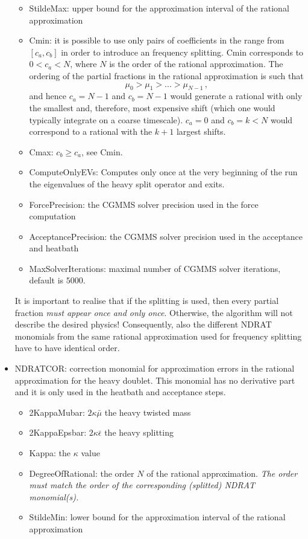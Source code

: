 \begin{itemize}
\begin{itemize}
  \item {\ttfamily StildeMax}:
    upper bound for the approximation interval of the rational approximation
  \item {\ttfamily Cmin}: it is possible to use only pairs of coefficients
    in the range from $[c_a,c_b]$ in order to introduce an frequency
    splitting. {\ttfamily Cmin} corresponds to $0<c_a< N$, where
    $N$ is the order of the rational approximation. The ordering of
    the partial fractions in the rational approximation is such that 
    \[
    \mu_0 > \mu_1 > ... > \mu_{N-1}\,,
    \]
    and hence $c_a = N-1$ and $c_b = N-1$ would generate a rational
    with only the smallest and, therefore, most expensive shift (which
    one would typically integrate on a coarse timescale). $c_a
    = 0$ and $c_b = k < N$ would correspond to a rational with the
    $k+1$ largest shifts.
  \item {\ttfamily Cmax}: $c_b\geq c_a$, see {\ttfamily Cmin}.
  \item {\ttfamily ComputeOnlyEVs}: Computes only once at the very
    beginning of the run the eigenvalues of the heavy split operator
    and exits.
  \item {\ttfamily ForcePrecision}: the CGMMS solver precision used in the
    force computation
  \item {\ttfamily AcceptancePrecision}: the CGMMS solver precision used in the
    acceptance and heatbath
  \item {\ttfamily MaxSolverIterations}: maximal number of CGMMS
    solver iterations, default is $5000$.
  \end{itemize}
  It is important to realise that if the splitting is used, then every
  partial fraction \emph{must appear once and only once}. Otherwise, the
  algorithm will not describe the desired physics! Consequently, also
  the different {\ttfamily NDRAT} monomials from the same rational
  approximation used for frequency splitting have to have identical
  order.

\item {\ttfamily NDRATCOR}: correction monomial for approximation
  errors in the rational approximation for the heavy doublet. This
  monomial has no derivative part and it is only used in the heatbath
  and acceptance steps.
  \begin{itemize}
  \item {\ttfamily 2KappaMubar}: $2\kappa\bar\mu$ the heavy twisted mass
  \item {\ttfamily 2KappaEpsbar}: $2\kappa\bar\epsilon$ the heavy
    splitting
  \item {\ttfamily Kappa}: the $\kappa$ value
  \item {\ttfamily DegreeOfRational}: the order $N$ of the rational
    approximation. \emph{The order must match the order of the corresponding
    (splitted) {\ttfamily NDRAT} monomial(s).}
  \item {\ttfamily StildeMin}: lower bound for the approximation
    interval of the rational approximation


\end{itemize}
\end{itemize}
